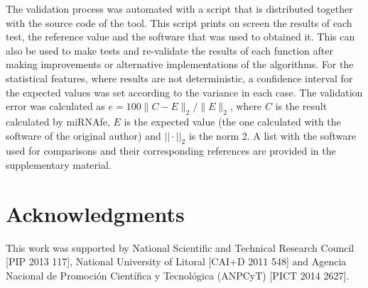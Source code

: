 \documentclass{article}
\begin{document}
The validation process was automated with a script that is distributed together with the source code of the tool. This script prints on screen the results of 
each test, the reference value and the software that was used to obtained it. This can also be used to make tests and re-validate the results of each function 
after making improvements or alternative implementations of the algorithms. For the statistical features, where results are not deterministic, a confidence 
interval for the expected values was set according to the variance in each case. The validation error was calculated as $e = 100 \|C- E\|_{2} / \|E\|_{2}$, 
where $C$ is the result calculated by miRNAfe, $E$ is the expected value (the one calculated with the software of the original author) and $||\cdot||_2$ is the 
norm 2. A list with the software used for comparisons and their corresponding references are provided in the supplementary material.


\section{Acknowledgments}
This work was supported by National Scientific and Technical Research Council [PIP 2013 117], National University of Litoral [CAI+D 2011 548] and Agencia 
Nacional de Promoci{\'o}n Cient{\'i}fica y Tecnol{\'o}gica (ANPCyT) [PICT 2014 2627].



\end{document}
